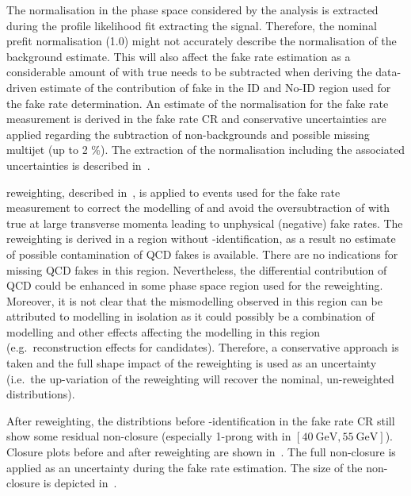 The \ttbar normalisation in the phase space considered by the analysis is
extracted during the profile likelihood fit extracting the signal. Therefore,
the nominal prefit \ttbar normalisation (1.0) might not accurately describe the
normalisation of the \ttbar background estimate. This will also affect the fake
rate estimation as a considerable amount of \ttbar with true \tauhad needs to be
subtracted when deriving the data-driven estimate of the contribution of fake
\tauhad in the ID and No-ID region used for the fake rate determination. An
estimate of the \ttbar normalisation for the fake rate measurement is derived in
the fake rate CR and conservative uncertainties are applied regarding the
subtraction of non-\ttbar backgrounds and possible missing multijet (up to 2
\%). The extraction of the \ttbar normalisation including the associated
uncertainties is described in~.

\ttbar reweighting, described in~,
is applied to events used for the fake rate measurement to correct the modelling
of \ttbar and avoid the oversubtraction of \ttbar with true \tauhad at large
\tauhad transverse momenta leading to unphysical (negative) fake rates. The
reweighting is derived in a region without \tauhad-identification, as a result
no estimate of possible contamination of QCD \tauhad fakes is available. There
are no indications for missing QCD \tauhad fakes in this region. Nevertheless,
the differential contribution of QCD could be enhanced in some phase space
region used for the reweighting. Moreover, it is not clear that the mismodelling
observed in this region can be attributed to \ttbar modelling in isolation as it
could possibly be a combination of \ttbar modelling and other effects affecting
the modelling in this region (e.g.\ reconstruction effects for \tauhad
candidates). Therefore, a conservative approach is taken and the full shape
impact of the reweighting is used as an uncertainty (i.e.\ the up-variation of
the reweighting will recover the nominal, un-reweighted distributions).

After reweighting, the \tauhad \pT distribtions before \tauhad-identification in
the \ttbar fake rate CR still show some residual non-closure (especially 1-prong
\tauhad with \tauhad \pT in $[\SI{40}{\GeV}, \SI{55}{\GeV}]$). Closure plots
before and after reweighting are shown
in~. The full non-closure is applied as
an uncertainty during the fake rate estimation. The size of the non-closure is
depicted in~.


